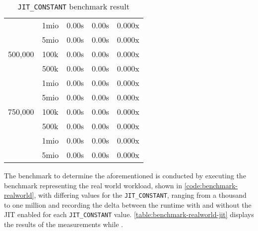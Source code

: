 \begin{table}[H]
\begin{tabular}{c|c|c|c|c}
                    & 1mio & 0.00s & 0.00s & 0.000x \\
                    & 5mio & 0.00s & 0.00s & 0.000x \\
        \hline
        500,000     & 100k & 0.00s & 0.00s & 0.000x \\
                    & 500k & 0.00s & 0.00s & 0.000x \\
                    & 1mio & 0.00s & 0.00s & 0.000x \\
                    & 5mio & 0.00s & 0.00s & 0.000x \\
        \hline
        750,000     & 100k & 0.00s & 0.00s & 0.000x \\
                    & 500k & 0.00s & 0.00s & 0.000x \\
                    & 1mio & 0.00s & 0.00s & 0.000x \\
                    & 5mio & 0.00s & 0.00s & 0.000x \\
    \end{tabular}
    \label{table:benchmark-realworld-jit}
    \caption{\texttt{JIT\_CONSTANT} benchmark result}
\end{table}

The benchmark to determine the aforementioned is conducted by executing the
benchmark representing the real world workload, shown in
\autoref{code:benchmark-realworld}, with differing values for the
\texttt{JIT\_CONSTANT}, ranging from a thousand to one million and recording
the delta between the runtime with and without the JIT enabled for each
\texttt{JIT\_CONSTANT} value. \autoref{table:benchmark-realworld-jit} displays
the results of the measurements while .

